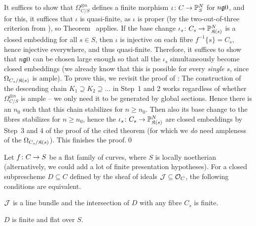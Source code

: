 \documentclass[a4paper,parskip=half,numbers=enddot, DIV=12]{scrreprt}
\renewcommand{\geq}{\geqslant}
\begin{document}
\begin{rem}
	It suffices to show that $\Omega_{C/S}^{\otimes n}$ defines a finite morphism $\iota\colon C\morphism\IP_S^N$ for $n\gge 0$, and for this, it suffices that $\iota$ is quasi-finite, as $\iota$ is proper (by the two-out-of-three criterion from \cite[Proposition~2.4.1]{alggeo2}), so Theorem~ applies. If the base change $\iota_s\colon C_s\morphism\IP_{\KK(s)}^N$ is a closed embedding for all $s\in S$, then $\iota$ is injective on each fibre $f^{-1}\{s\}= C_s$, hence injective everywhere, and thus quasi-finite. Therefore, it suffices to show that $n\gge 0$ can be chosen large enough so that all the $\iota_s$ simultaneously become closed embeddings (we already know that this is possible for every \emph{single} $s$, since $\Omega_{C_s/\mathfrak{K}(s)}$ is ample). To prove this, we revisit the proof of \cite[Theorem~6]{alggeo2}: The construction of the descending chain $K_1\supseteq K_2\supseteq\ldots$ in Step~1 and 2 works regardless of whether $\Omega_{C/S}^{\otimes n}$ is ample -- we only need it to be generated by global sections. Hence there is an $n_0$ such that this chain stabilizes for $n\geq n_0$. Then also its base change to the fibres stabilizes for $n\geq n_0$, hence the $\iota_s\colon C_s\morphism\IP_{\KK(s)}^N$ are closed embeddings by Step~3 and 4 of the proof of the cited theorem (for which we \emph{do} need ampleness of the $\Omega_{C_s/\mathfrak{K}(s)}$). This finishes the proof.\qed
\end{rem}
\begin{lem}
	Let $f\colon C\morphism S$ be a flat family of curves, where $S$ is locally noetherian (alternatively, we could add a lot of finite presentation hypotheses). For a closed subprescheme $D\subseteq C$ defined by the sheaf of ideals $\mathcal{J}\subseteq \mathcal{O}_C$, the following conditions are equivalent.
	\begin{alphanumerate}
		\item $\mathcal{J}$ is a line bundle and the intersection of $D$ with any fibre $C_s$ is finite.
		\item $D$ is finite and flat over $S$.
	\end{alphanumerate}
\end{lem}
\end{document}
